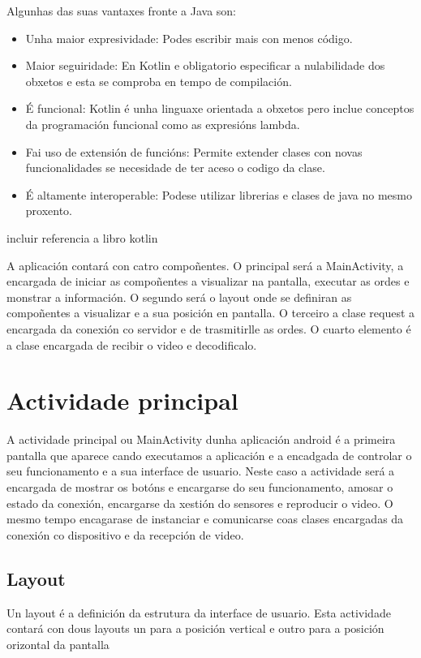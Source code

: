 Algunhas das suas vantaxes fronte a Java son:
\begin{itemize}
    \item Unha maior expresividade: Podes escribir mais con menos código.
    \item Maior seguiridade: En Kotlin e obligatorio especificar a nulabilidade dos obxetos e esta se comproba en tempo de compilación.
    \item É funcional: Kotlin é unha linguaxe orientada a obxetos pero inclue conceptos da programación funcional como as expresións lambda.
    \item Fai uso de extensión de funcións: Permite extender clases con novas funcionalidades se necesidade de ter aceso o codigo da clase.
    \item É altamente interoperable: Podese utilizar librerias e  clases de java no mesmo proxento.
\end{itemize}
incluir referencia a libro kotlin

A aplicación contará con catro compoñentes. O principal será a MainActivity, a encargada de iniciar as compoñentes a visualizar na pantalla, executar as ordes e monstrar a información. O segundo será o layout onde se definiran as compoñentes a visualizar e a sua posición en pantalla. O terceiro a clase request a encargada da conexión co servidor e de trasmitirlle as ordes. O cuarto elemento é a clase encargada de recibir o video e decodificalo.

\section{Actividade principal}
A actividade principal ou MainActivity dunha aplicación android é a primeira pantalla que aparece cando executamos a aplicación e a encadgada de controlar o seu funcionamento e a sua interface de usuario. Neste caso a actividade será a encargada de mostrar os botóns e encargarse do seu funcionamento, amosar o estado da conexión, encargarse da xestión do sensores e reproducir o video. O mesmo tempo encagarase de instanciar e comunicarse coas clases encargadas da conexión co dispositivo e da recepción de video.

\subsection{Layout}
Un layout é a definición da estrutura da interface de usuario. Esta actividade contará con dous layouts un para a posición vertical e outro para a posición orizontal da pantalla
